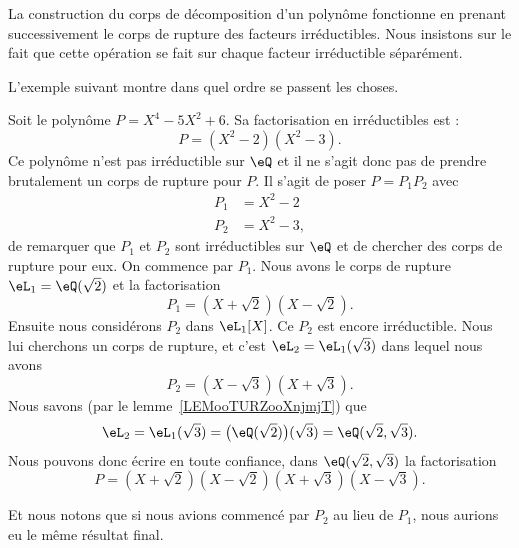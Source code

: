 \begin{normaltext}
	La construction du corps de décomposition d'un polynôme fonctionne en prenant successivement le corps de rupture des facteurs irréductibles. Nous insistons sur le fait que cette opération se fait sur chaque facteur irréductible séparément.

	L'exemple suivant montre dans quel ordre se passent les choses.

	\begin{example}
		Soit le polynôme \( P=X^4-5X^2+6\). Sa factorisation en irréductibles est :
		\begin{equation}
			P=(X^2-2)(X^2-3).
		\end{equation}
		Ce polynôme n'est pas irréductible sur \( \eQ\) et il ne s'agit donc pas de prendre brutalement un corps de rupture pour \( P\). Il s'agit de poser \( P=P_1P_2\) avec
		\begin{subequations}
			\begin{align}
				P_1 & =X^2-2  \\
				P_2 & =X^2-3,
			\end{align}
		\end{subequations}
		de remarquer que \( P_1\) et \( P_2\) sont irréductibles sur \( \eQ\) et de chercher des corps de rupture pour eux. On commence par \( P_1\). Nous avons le corps de rupture \( \eL_1=\eQ(\sqrt{ 2 })\) et la factorisation
		\begin{equation}
			P_1=(X+\sqrt{ 2 })(X-\sqrt{ 2 }).
		\end{equation}
		Ensuite nous considérons \( P_2\) dans \( \eL_1[X]\). Ce \( P_2\) est encore irréductible. Nous lui cherchons un corps de rupture, et c'est \( \eL_2=\eL_1(\sqrt{ 3 })\) dans lequel nous avons
		\begin{equation}
			P_2=(X-\sqrt{ 3 })(X+\sqrt{ 3 }).
		\end{equation}
		Nous savons (par le lemme~\ref{LEMooTURZooXnjmjT}) que
		\begin{equation}
			\eL_2=\eL_1(\sqrt{ 3 })=\big( \eQ(\sqrt{ 2 }) \big)(\sqrt{ 3 })=\eQ(\sqrt{ 2 },\sqrt{ 3 }).
		\end{equation}
		Nous pouvons donc écrire en toute confiance, dans \( \eQ(\sqrt{ 2 },\sqrt{ 3 })\) la factorisation
		\begin{equation}
			P=(X+\sqrt{ 2 })(X-\sqrt{ 2 })(X+\sqrt{ 3 })(X-\sqrt{ 3 }).
		\end{equation}

		Et nous notons que si nous avions commencé par \( P_2\) au lieu de \( P_1\), nous aurions eu le même résultat final.
	\end{example}
\end{normaltext}

